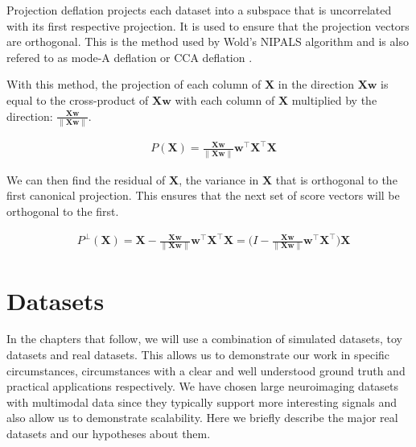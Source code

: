 Projection deflation projects each dataset into a subspace that is uncorrelated with its first respective projection. It is used to ensure that the projection vectors are orthogonal. This is the method used by Wold's NIPALS algorithm and is also refered to as mode-A deflation or CCA deflation \cite{mackey2009deflation}.

With this method, the projection of each column of $\mathbf{X}$ in the direction $\mathbf{Xw}$ is equal to the cross-product of $\mathbf{Xw}$ with each column of $\mathbf{X}$ multiplied by the direction: $\frac{\mathbf{Xw}}{\|\mathbf{Xw}\|}$.

\begin{align}
     & P(\mathbf{X})= \frac{\mathbf{Xw}}{\|\mathbf{Xw}\|}\mathbf{w^{\top}X^{\top}X}
\end{align}

We can then find the residual of $\mathbf{X}$, the variance in $\mathbf{X}$  that is orthogonal to the first canonical projection. This ensures that the next set of score vectors will be orthogonal to the first.

\begin{align}
     & P^\perp(\mathbf{X})= \mathbf{X} - \frac{\mathbf{Xw}}{\|\mathbf{Xw}\|}\mathbf{w^{\top}X^{\top}X} = (I - \frac{\mathbf{Xw}}{\|\mathbf{Xw}\|}\mathbf{w^{\top}X^{\top})X}
\end{align}


\section{Datasets}

In the chapters that follow, we will use a combination of simulated datasets, toy datasets and real datasets. This allows us to demonstrate our work in specific circumstances, circumstances with a clear and well understood ground truth and practical applications respectively. We have chosen large neuroimaging datasets with multimodal data since they typically support more interesting signals and also allow us to demonstrate scalability. Here we briefly describe the major real datasets and our hypotheses about them.





